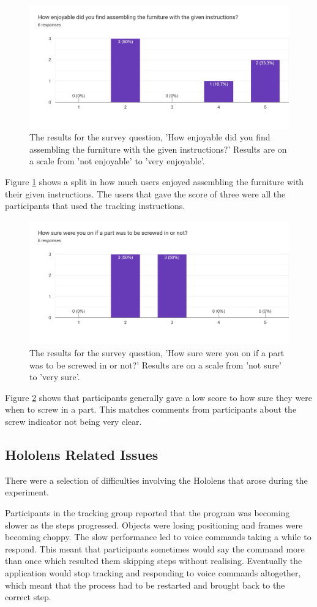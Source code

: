 \documentclass{l4proj}
\begin{document}
\begin{figure}[hbt!]
    \centering
    \includegraphics[width=0.5\linewidth]{dissertation//images/surveyEnjoyable.jpg}
    \caption{The results for the survey question, 'How enjoyable did you find assembling the furniture with the given instructions?' Results are on a scale from 'not enjoyable' to 'very enjoyable'.}
    \label{fig:surveyEnjoyable}
\end{figure}

Figure \ref{fig:surveyEnjoyable} shows a split in how much users enjoyed assembling the furniture with their given instructions. The users that gave the score of three were all the participants that used the tracking instructions.

\begin{figure}[hbt!]
    \centering
    \includegraphics[width=0.5\linewidth]{dissertation//images/surveyScrew.jpg}
    \caption{The results for the survey question, 'How sure were you on if a part was to be screwed in or not?' Results are on a scale from 'not sure' to 'very sure'.}
    \label{fig:surveyScrew}
\end{figure}

Figure \ref{fig:surveyScrew} shows that participants generally gave a low score to how sure they were when to screw in a part. This matches comments from participants about the screw indicator not being very clear.

\subsection{Hololens Related Issues}

There were a selection of difficulties involving the Hololens that arose during the experiment.

Participants in the tracking group reported that the program was becoming slower as the steps progressed. Objects were losing positioning and frames were becoming choppy. The slow performance led to voice commands taking a while to respond. This meant that participants sometimes would say the command more than once which resulted them skipping steps without realising. Eventually the application would stop tracking and responding to voice commands altogether, which meant that the process had to be restarted and brought back to the correct step.
\end{document}
